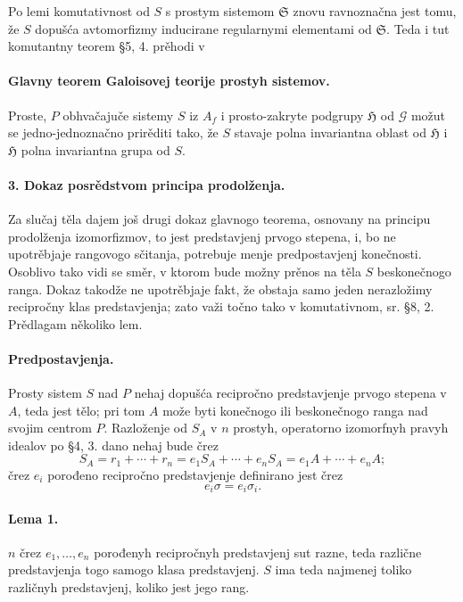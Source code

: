 \documentclass[11pt]{article}
\providecommand{\Gcal}{\mathcal G}
\begin{document}
Po lemi komutativnost od \(S\) s prostym sistemom \(\mathfrak S\) znovu ravnoznačna jest tomu, že \(S\) dopušća avtomorfizmy inducirane regularnymi elementami od \(\mathfrak S\). Teda i tut komutantny teorem §5, 4. prěhodi v

\paragraph{Glavny teorem Galoisovej teorije prostyh sistemov.}
Proste, \(P\) obhvačajuče sistemy \(S\) iz \(A_f\) i prosto-zakryte podgrupy \(\mathfrak H\) od \(\Gcal\) možut se jedno-jednoznačno prirěditi tako, že \(S\) stavaje polna invariantna oblast od \(\mathfrak H\) i \(\mathfrak H\) polna invariantna grupa od \(S\).

\paragraph{3. Dokaz posrědstvom principa prodolženja.}
Za slučaj těla dajem još drugi dokaz glavnogo teorema, osnovany na principu prodolženja izomorfizmov, to jest predstavjenj prvogo stepena, i, bo ne upotrěbjaje rangovogo sčitanja, potrebuje menje predpostavjenj konečnosti. Osoblivo tako vidi se směr, v ktorom bude možny prěnos na těla \(S\) beskonečnogo ranga. Dokaz takodže ne upotrěbjaje fakt, že obstaja samo jeden nerazložimy recipročny klas predstavjenja; zato važi točno tako v komutativnom, sr. §8, 2. Prědlagam několiko lem.

\paragraph{Predpostavjenja.}
Prosty sistem \(S\) nad \(P\) nehaj dopušća recipročno predstavjenje prvogo stepena v \(A\), teda jest tělo; pri tom \(A\) može byti konečnogo ili beskonečnogo ranga nad svojim centrom \(P\). Razloženje od \(S_A\) v \(n\) prostyh, operatorno izomorfnyh pravyh idealov po §4, 3. dano nehaj bude črez
\[
        S_A=r_1+\cdots+r_n
            =e_1S_A+\cdots+e_nS_A
            =e_1A+\cdots+e_nA ;
\]
črez \(e_i\) porođeno recipročno predstavjenje definirano jest črez
\[
        e_i\sigma=e_i\sigma_i .
\]

\paragraph{Lema 1.}
\(n\) črez \(e_1,\ldots,e_n\) porođenyh recipročnyh predstavjenj sut razne, teda različne predstavjenja togo samogo klasa predstavjenj. \(S\) ima teda najmenej toliko različnyh predstavjenj, koliko jest jego rang.
\end{document}
